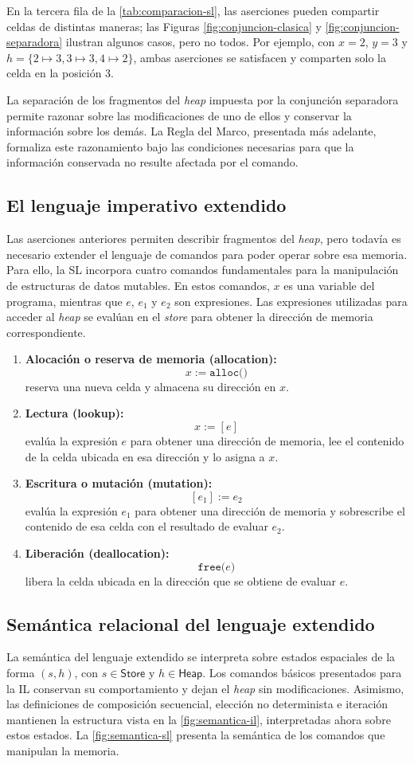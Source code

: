 \documentclass[a4paper,	11pt]{report}
\begin{document}
En la tercera fila de la \autoref{tab:comparacion-sl},
las aserciones pueden compartir celdas de distintas maneras;
las Figuras \ref{fig:conjuncion-clasica} y \ref{fig:conjuncion-separadora} ilustran algunos casos,
pero no todos.
Por ejemplo,
con $x = 2$, $y = 3$ y $h = \{2 \mapsto 3, 3 \mapsto 3, 4 \mapsto 2\}$,
ambas aserciones se satisfacen y comparten solo la celda en la posición 3.

La separación de los fragmentos del \emph{heap} impuesta por la conjunción separadora
permite razonar sobre las modificaciones de uno de ellos
y conservar la información sobre los demás.
La Regla del Marco, presentada más adelante,
formaliza este razonamiento bajo las condiciones necesarias para que la información conservada no resulte afectada por el comando.

\subsection*{El lenguaje imperativo extendido}
Las aserciones anteriores permiten describir fragmentos del \emph{heap},
pero todavía es necesario extender el lenguaje de comandos para poder operar sobre esa memoria.
Para ello, la SL incorpora cuatro comandos fundamentales para la manipulación de estructuras de datos mutables.
En estos comandos,
$x$ es una variable del programa,
mientras que $e$, $e_1$ y $e_2$ son expresiones.
Las expresiones utilizadas para acceder al \emph{heap} se evalúan en el \emph{store} para obtener la dirección de memoria correspondiente.
\begin{enumerate}
  \item \textbf{Alocación o reserva de memoria (allocation):}
  $$x := \texttt{alloc()}$$
  reserva una nueva celda y almacena su dirección en $x$.
  \item \textbf{Lectura (lookup):}
  $$x := [e]$$
  evalúa la expresión $e$ para obtener una dirección de memoria,
  lee el contenido de la celda ubicada en esa dirección y lo asigna a $x$.
  \item \textbf{Escritura o mutación (mutation):}
  $$[e_1] := e_2$$
  evalúa la expresión $e_1$ para obtener una dirección de memoria y
  sobrescribe el contenido de esa celda con el resultado de evaluar $e_2$.
  \item \textbf{Liberación (deallocation):}
  $$\texttt{free(}e\texttt{)}$$
  libera la celda ubicada en la dirección que se obtiene de evaluar $e$.
\end{enumerate}

\subsection*{Semántica relacional del lenguaje extendido}
La semántica del lenguaje extendido se interpreta sobre estados espaciales de la forma $(s,h)$,
con $s \in \mathsf{Store}$ y $h \in \mathsf{Heap}$.
Los comandos básicos presentados para la IL conservan su comportamiento y dejan el \emph{heap} sin modificaciones.
Asimismo,
las definiciones de composición secuencial,
elección no determinista e iteración mantienen la estructura vista en la \autoref{fig:semantica-il},
interpretadas ahora sobre estos estados.
La \autoref{fig:semantica-sl} presenta la semántica de los comandos que manipulan la memoria.
\end{document}
